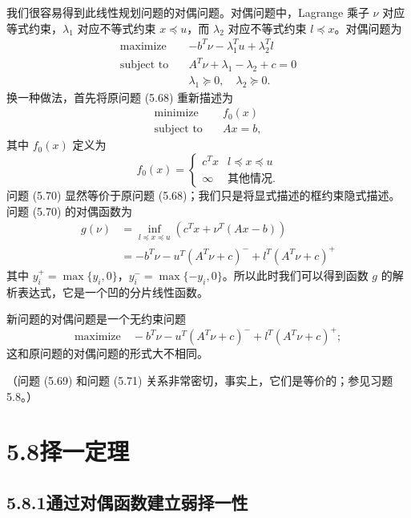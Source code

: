 \documentclass[UTF8, 12pt, fontset=fandol, oneside]{ctexart}
\begin{document}
我们很容易得到此线性规划问题的对偶问题。对偶问题中，Lagrange 乘子 $\nu$ 对应等式约束，$\lambda_1$ 对应不等式约束 $x\preceq u$，而 $\lambda_2$ 对应不等式约束 $l\preceq x$。对偶问题为
\begin{equation}
\begin{aligned}
\text{maximize}\quad & -b^T\nu-\lambda_1^Tu+\lambda_2^Tl\\
\text{subject to}\quad & A^T\nu+\lambda_1-\lambda_2+c=0\\
& \lambda_1\succeq 0,\quad \lambda_2\succeq 0.
\end{aligned}
\tag{5.69}
\end{equation}
换一种做法，首先将原问题 (5.68) 重新描述为
\begin{equation}
\begin{aligned}
\text{minimize}\quad & f_0(x)\\
\text{subject to}\quad & Ax=b,
\end{aligned}
\tag{5.70}
\end{equation}
其中 $f_0(x)$ 定义为
\[
f_0(x)=
\begin{cases}
c^Tx & l\preceq x\preceq u\\
\infty & \text{其他情况}.
\end{cases}
\]
问题 (5.70) 显然等价于原问题 (5.68)；我们只是将显式描述的框约束隐式描述。问题 (5.70) 的对偶函数为
\[
\begin{aligned}
g(\nu)
&=\inf_{l\preceq x\preceq u}(c^Tx+\nu^T(Ax-b))\\
&=-b^T\nu-u^T(A^T\nu+c)^-+l^T(A^T\nu+c)^+
\end{aligned}
\]
其中 $y_i^+=\max\{y_i,0\}$，$y_i^-=\max\{-y_i,0\}$。所以此时我们可以得到函数 $g$ 的解析表达式，它是一个凹的分片线性函数。

新问题的对偶问题是一个无约束问题
\begin{equation}
\text{maximize}\quad -b^T\nu-u^T(A^T\nu+c)^-+l^T(A^T\nu+c)^+;
\tag{5.71}
\end{equation}
这和原问题的对偶问题的形式大不相同。

（问题 (5.69) 和问题 (5.71) 关系非常密切，事实上，它们是等价的；参见习题 5.8。）

\section*{5.8\quad 择一定理}

\subsection*{5.8.1\quad 通过对偶函数建立弱择一性}
\end{document}
